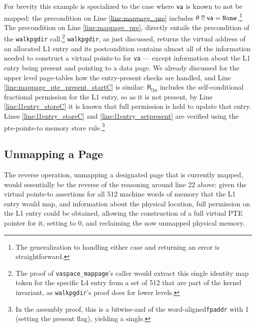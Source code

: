 For brevity this example is specialized to the case where $\mathsf{va}$ is known to not be mapped:
the precondition on Line \ref{line:mappage_pre} includes $\theta \; !!\; \mathsf{va} = \texttt{None}$.\footnote{
  The generalization to handling either case and returning an error is straightforward.
}
The precondition on Line \ref{line:mappage_pre}, directly entails
the precondition of the \lstinline|walkpgdir| call.\footnote{The proof of \lstinline|vaspace_mappage|'s caller
would extract this single identity map token for the specific L4 entry from a set of 512 that are
part of the kernel invariant, as \lstinline|walkpgdir|'s proof does for lower levels.
}
\lstinline|walkpgdir|, as just discussed,
returns the virtual address of an allocated L1 entry and its postcondition contains almost all of the information
needed to construct a virtual points-to for \lstinline|va| --- except information about the L1 entry
being present and pointing to a data page.
We already discussed for the upper level page-tables how the entry-present checks are handled, and
Line \ref{line:mappage_pte_present_startC} is similar: $\mathsf{R}_{\textsf{l1e}}$ includes the self-conditional
fractional permission for the L1 entry, so as it is not present, by Line \ref{line:l1entry_storeC}
it is known that full permission is held to update that entry.
Lines \ref{line:l1entry_storeC} and \ref{line:l1entry_setpresent} are verified using the pte-points-to
memory store rule.\footnote{In the assembly proof, this is a bitwise-and of the word-aligned\lstinline|fpaddr| with 1
(setting the present flag), yielding a single.
}

\ifPLDI
\else
\subsection{Unmapping a Page}
The reverse operation, unmapping a designated page that is currently mapped,
would essentially be the reverse of
the reasoning around line 22 above: given the virtual points-to assertions for all 512
machine words of memory that the L1 entry would map,
and information about the physical location, 
full permission on the L1 entry could be obtained, allowing the construction of a
full virtual PTE pointer for it, setting to 0, and reclaiming the now unmapped physical memory.
\fi

